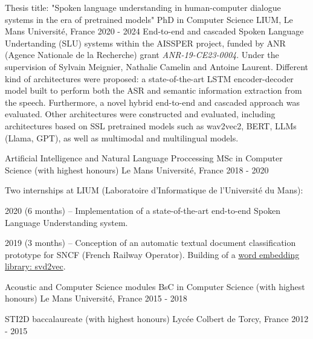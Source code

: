 
\begin{cventries}
	\cventry
		{Thesis title: \normalfont"Spoken language understanding in human-computer dialogue systems in the era of pretrained models"}
		{PhD in Computer Science}
		{LIUM, Le Mans Université, France}
		{2020 - 2024}
		{End-to-end and cascaded Spoken Language Undertanding (SLU) systems within the AISSPER project, funded by ANR (Agence Nationale de la Recherche) grant \textit{ANR-19-CE23-0004}. Under the supervision of Sylvain Meignier, Nathalie Camelin and Antoine Laurent.\newline%
		Different kind of architectures were proposed: a state-of-the-art LSTM encoder-decoder model built to perform both the ASR and semantic information extraction from the speech. Furthermore, a novel hybrid end-to-end and cascaded approach was evaluated. Other architectures were constructed and evaluated, including architectures based on SSL pretrained models such as wav2vec2, BERT, LLMs (Llama, GPT), as well as multimodal and multilingual models.
		}

	\cventry
		{Artificial Intelligence and Natural Language Proccessing}
		{MSc in Computer Science \normalfont (with highest honours)}
		{Le Mans Université, France}
		{2018 - 2020}
		{
			Two internships at LIUM (Laboratoire d'Informatique de l'Université du Mans):
			\vspace{0.5cm}
			\begin{cvitems}
				\item {2020 (6 months) -- Implementation of a state-of-the-art end-to-end Spoken Language Understanding system.}
				\item {2019 (3 months) -- Conception of an automatic textual document classification prototype for SNCF (French Railway Operator). Building of a \href{https://github.com/valentinp72/svd2vec}{word embedding library: svd2vec}.}
			\end{cvitems}
		}

	\cventry
		{Acoustic and Computer Science modules}
		{BsC in Computer Science \normalfont (with highest honours)}
		{Le Mans Université, France}
		{2015 - 2018}
		{}

	\cventry
		{}
		{STI2D baccalaureate \normalfont (with highest honours)}
		{Lycée Colbert de Torcy, France}
		{2012 - 2015}
		{}	

\end{cventries}

